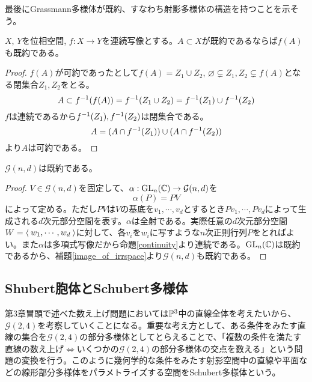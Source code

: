 \documentclass{ltjsreport}
\begin{document}
最後にGrassmann多様体が既約、すなわち射影多様体の構造を持つことを示そう。

\begin{lemm}\label{image_of_irrspace}
  $X$, $Y$を位相空間, $f:X\rightarrow Y$を連続写像とする。$A\subset X$が既約であるならば$f(A)$も既約である。
\end{lemm}

\begin{proof}
  $f(A)$が可約であったとして$f(A)=Z_1\cup Z_2$, $\varnothing\subsetneq Z_1,Z_2\subsetneq f(A)$となる閉集合$Z_1,Z_2$をとる。
  \[
  A\subset f^{-1}(f(A))=f^{-1}(Z_1\cup Z_2)=f^{-1}(Z_1)\cup f^{-1}(Z_2)  
  \]
  $f$は連続であるから$f^{-1}(Z_1), f^{-1}(Z_2)$は閉集合である。
  \[
  A=(A\cap f^{-1}(Z_1))\cup(A\cap f^{-1}(Z_2))
  \]
  より$A$は可約である。
\end{proof}

\begin{prop}
  $\mathcal{G}(n,d)$は既約である。
\end{prop}

\begin{proof}
  $V\in\mathcal{G}(n,d)$を固定して、$\alpha:\text{GL}_n(\mathbb{C})\rightarrow\mathcal{G}(n,d)$を
  \[
  \alpha(P)=PV  
  \]
  によって定める。ただし$PV$は$V$の基底を$v_1,\cdots,v_d$とするとき$Pv_1,\cdots,Pv_d$によって生成される$d$次元部分空間を表す。$\alpha$は全射である。実際任意の$d$次元部分空間$W=\langle\:w_1,\cdots,w_d\:\rangle$に対して、各$v_i$を$w_i$に写すような$n$次正則行列$P$をとればよい。また$\alpha$は多項式写像だから命題\ref{continuity}より連続である。$\text{GL}_n(\mathbb{C})$は既約であるから、補題\ref{image_of_irrspace}より$\mathcal{G}(n,d)$も既約である。
\end{proof}






\subsection{Shubert胞体とSchubert多様体}

第3章冒頭で述べた数え上げ問題においては$\mathbb{P}^3$中の直線全体を考えたいから、$\mathcal{G}(2,4)$を考察していくことになる。重要な考え方として、ある条件をみたす直線の集合を$\mathcal{G}(2,4)$の部分多様体としてとらえることで、「複数の条件を満たす直線の数え上げ$\Leftrightarrow$いくつかの$\mathcal{G}(2,4)$の部分多様体の交点を数える」という問題の変換を行う。このように幾何学的な条件をみたす射影空間中の直線や平面などの線形部分多様体をパラメトライズする空間をSchubert多様体という。
\end{document}
